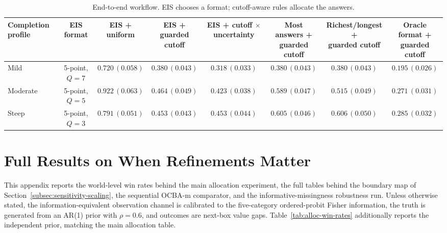\documentclass[11pt]{article}
\theoremstyle{definition}
\theoremstyle{remark}
\newcommand{\1}{\mathbf{1}}
\begin{document}
\begin{table}[H]
\centering
\tiny
\setlength{\tabcolsep}{2pt}
\begin{tabular}{lccccccc}
\toprule
Completion profile & EIS format & \shortstack{EIS +\\uniform} &
\shortstack{EIS +\\guarded cutoff} &
\shortstack{EIS + cutoff\\$\times$ uncertainty} &
\shortstack{Most answers +\\guarded cutoff} &
\shortstack{Richest/longest +\\guarded cutoff} &
\shortstack{Oracle format +\\guarded cutoff} \\
\midrule
Mild     & 5-point, \(Q=7\) & \(0.720\,(0.058)\) & \(0.380\,(0.043)\) & \(0.318\,(0.033)\) & \(0.380\,(0.043)\) & \(0.380\,(0.043)\) & \(0.195\,(0.026)\) \\
Moderate & 5-point, \(Q=5\) & \(0.922\,(0.063)\) & \(0.464\,(0.049)\) & \(0.423\,(0.038)\) & \(0.589\,(0.047)\) & \(0.515\,(0.049)\) & \(0.271\,(0.031)\) \\
Steep    & 5-point, \(Q=3\) & \(0.791\,(0.051)\) & \(0.453\,(0.043)\) & \(0.453\,(0.044)\) & \(0.605\,(0.046)\) & \(0.606\,(0.050)\) & \(0.285\,(0.032)\) \\
\bottomrule
\end{tabular}
\caption{End-to-end workflow. EIS chooses a format; cutoff-aware rules allocate the answers.}
\label{tab:eis-workflow}
\end{table}

\section{Full Results on When Refinements Matter}
\label{app:refinement-tables}

This appendix reports the world-level win rates behind the main
allocation experiment, the full tables behind the boundary map of
Section~\ref{subsec:sensitivity-scaling}, the sequential OCBA-m
comparator, and the informative-missingness robustness run. Unless
otherwise stated, the information-equivalent observation channel is
calibrated to the five-category ordered-probit Fisher information, the
truth is generated from an AR(1) prior with \(\rho=0.6\), and
outcomes are next-box value gaps. Table~\ref{tab:alloc-win-rates}
additionally reports the independent prior, matching the main
allocation table.
\end{document}
